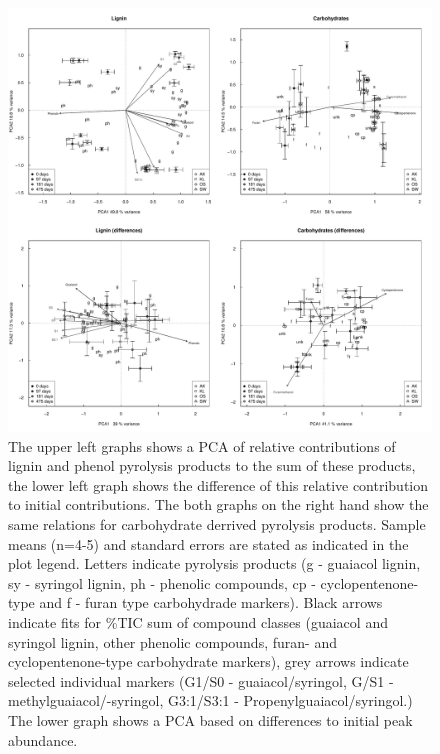 \documentclass[preprint,review,12pt]{elsarticle}
\begin{document}
\newpage
\begin{figure}[h!]
\begin{center}
\includegraphics{aap-pcalph}
\end{center}
\caption{The upper left graphs shows a PCA of relative contributions of lignin and phenol pyrolysis products to the sum of these products, the lower left graph shows the difference of this relative contribution to initial contributions. The both graphs on the right hand show the same relations for carbohydrate derrived pyrolysis products. Sample means (n=4-5) and standard errors are stated as indicated in the plot legend. Letters indicate pyrolysis products (g - guaiacol lignin, sy - syringol lignin, ph - phenolic compounds, cp - cyclopentenone-type and f - furan type carbohydrade markers). Black arrows indicate fits for \%TIC sum of compound classes (guaiacol and syringol lignin, other phenolic compounds, furan- and cyclopentenone-type carbohydrate markers), grey arrows indicate selected individual markers (G1/S0 - guaiacol/syringol, G/S1 - methylguaiacol/-syringol, G3:1/S3:1 - Propenylguaiacol/syringol.) The lower graph shows a PCA based on  differences to initial peak abundance.}
\label{fig:pcalph}
\end{figure}
\end{document}
